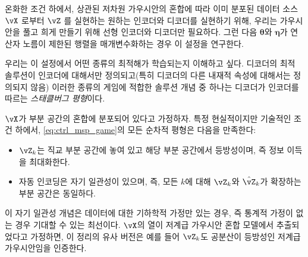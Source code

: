 \documentclass[../../book-main_ko.tex]{subfiles}
\begin{document}
온화한 조건 하에서, 상관된 저차원 가우시안의 혼합에 따라 이미 분포된 데이터 소스 \(\vX\) 로부터 \(\vZ\) 를 실현하는 원하는 인코더와 디코더를 실현하기 위해, 우리는 가우시안을 풀고 희게 만들기 위해 선형 인코더와 디코더만 필요하다. 그런 다음 \(\bm \theta\)와 \(\bm \eta\)가 연산자 노름이 제한된 행렬을 매개변수화하는 경우 이 설정을 연구한다.

우리는 이 설정에서 어떤 종류의 최적해가 학습되는지 이해하고 싶다. 디코더의 최적 솔루션이 인코더에 대해서만 정의되고(특히 디코더의 다른 내재적 속성에 대해서는 정의되지 않음) 이러한 종류의 게임에 적합한 솔루션 개념 중 하나는 디코더가 인코더를 따르는 \textit{스태클버그 평형}이다. %
\begin{theorem}\label{thm:ctrl_theory}
    $\vX$가 부분 공간의 혼합에 분포되어 있다고 가정하자. 특정 현실적이지만 기술적인 조건 하에서, \eqref{eq:ctrl_msp_game}의 모든 순차적 평형은 다음을 만족한다:
    \begin{itemize}
        	
\item $\vZ_{k}$는 직교 부분 공간에 놓여 있고 해당 부분 공간에서 등방성이며, 즉 정보 이득을 최대화한다.
        	
\item 자동 인코딩은 자기 일관성이 있으며, 즉, 모든 $k$에 대해 $\vZ_{k}$와 $\hat{\vZ}_{k}$가 확장하는 부분 공간은 동일하다.
    \end{itemize}
\end{theorem}
이 자기 일관성 개념은 데이터에 대한 기하학적 가정만 있는 경우, 즉 통계적 가정이 없는 경우 기대할 수 있는 최선이다. $\vX$의 열이 저계급 가우시안 혼합 모델에서 추출되었다고 가정하면, 이 정리의 유사 버전은 예를 들어 $\vZ_{k}$도 공분산이 등방성인 저계급 가우시안임을 인증한다. %
\end{document}
